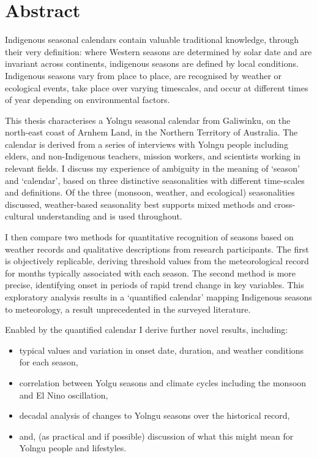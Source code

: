\chapter{Abstract}

Indigenous seasonal calendars contain valuable traditional knowledge,
through their very definition:  where Western seasons are determined by
solar date and are invariant across continents,
indigenous seasons are defined by local conditions.
%
Indigenous seasons vary from place to place, are recognised by weather or ecological events,
take place over varying timescales, and occur at different times of year depending on environmental factors.

This thesis characterises a Yolngu seasonal calendar from Galiwinku,
on the north-east coast of Arnhem Land, in the Northern Territory of Australia.
%
The calendar is derived from a series of interviews with Yolngu people including elders, and
non-Indigenous teachers, mission workers, and scientists working in relevant fields.
%
I discuss my experience of ambiguity in the meaning of `season' and `calendar',
based on three distinctive seasonalities with different time-scales and definitions.
Of the three (monsoon, weather, and ecological) seasonalities discussed, weather-based
seasonality best supports mixed methods and cross-cultural understanding and is used throughout.

I then compare two methods for quantitative recognition of seasons based on weather records
and qualitative descriptions from research participants.  The first is objectively replicable,
deriving threshold values from the meteorological record for months typically associated with each season.
The second method is more precise, identifying onset in periods of rapid trend change in key variables.
This exploratory analysis results in a `quantified calendar' mapping Indigenous seasons to meteorology,
a result unprecedented in the surveyed literature.

Enabled by the quantified calendar I derive further novel results, including:
\begin{itemize}
\item typical values and variation in onset date, duration, and weather conditions for each season,
\item correlation between Yolgu seasons and climate cycles including
        the monsoon and El Nino oscillation,
\item decadal analysis of changes to Yolngu seasons over the historical record,
\item and, (as practical and if possible) discussion of what this might mean for Yolngu people and lifestyles.
\end{itemize}


